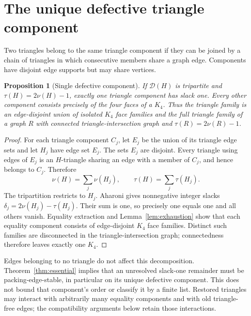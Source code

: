 \documentclass[11pt]{article}
\newtheorem{proposition}[theorem]{Proposition}
\theoremstyle{definition}\newtheorem{definition}[theorem]{Definition}
\theoremstyle{remark}\newtheorem{remark}[theorem]{Remark}
\newcommand{\D}{\mathcal D}
\begin{document}
\section{The unique defective triangle component}\label{sec:component}
Two triangles belong to the same triangle component if they can be joined by a chain of triangles in which consecutive members share a graph edge. Components have disjoint edge supports but may share vertices.
\begin{proposition}[Single defective component]\label{prop:component}
If $\D(H)$ is tripartite and $\tau(H)=2\nu(H)-1$, exactly one triangle component has slack one. Every other component consists precisely of the four faces of a $K_4$. Thus the triangle family is an edge-disjoint union of isolated $K_4$ face families and the full triangle family of a graph $R$ with connected triangle-intersection graph and $\tau(R)=2\nu(R)-1$.
\end{proposition}
\begin{proof}\leavevmode
For each triangle component $C_j$, let $E_j$ be the union of its triangle edge sets and let $H_j$ have edge set $E_j$. The sets $E_j$ are disjoint. Every triangle using edges of $E_j$ is an $H$-triangle sharing an edge with a member of $C_j$, and hence belongs to $C_j$. Therefore
\begin{equation}
\nu(H)=\sum_j\nu(H_j),\qquad \tau(H)=\sum_j\tau(H_j).
\end{equation}
The tripartition restricts to $H_j$. Aharoni gives nonnegative integer slacks $\delta_j=2\nu(H_j)-\tau(H_j)$. Their sum is one, so precisely one equals one and all others vanish. Equality extraction and Lemma~\ref{lem:exhaustion} show that each equality component consists of edge-disjoint $K_4$ face families. Distinct such families are disconnected in the triangle-intersection graph; connectedness therefore leaves exactly one $K_4$.
\end{proof}
Edges belonging to no triangle do not affect this decomposition. Theorem~\ref{thm:essential} implies that an unresolved slack-one remainder must be packing-edge-stable, in particular on its unique defective component. This does not bound that component's order or classify it by a finite list. Restored triangles may interact with arbitrarily many equality components and with old triangle-free edges; the compatibility arguments below retain those interactions.
\end{document}
